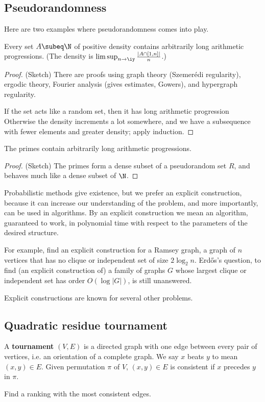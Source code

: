 
\subsection{Pseudorandomness}
Here are two examples where pseudorandomness comes into play.
\begin{thm}
Every set $A\subeq \N$ of positive density contains arbitrarily long arithmetic progressions. (The density is $\limsup_{n\to \iy} \frac{|A\cap [1,n]|}{n}$.)
\end{thm}
\begin{proof} (Sketch)
There are proofs using graph theory (Szemer\'edi regularity), ergodic theory, Fourier analysis (gives estimates, Gowers), and hypergraph regularity.

If the set acts like a random set, then it has long arithmetic progression
Otherwise the density increments a lot somewhere, and we have a subsequence with fewer elements and greater density; apply induction.
\end{proof}
\begin{thm}
The primes contain arbitrarily long arithmetic progressions.
\end{thm}
\begin{proof}(Sketch)
The primes form a dense subset of a pseudorandom set $R$, and behaves much like a dense subset of $\N$.
\end{proof}

Probabilistic methods give existence, but we prefer an explicit construction, because it can increase our understanding of the problem, and more importantly, can be used in algorithms. By an explicit construction we mean an algorithm, guaranteed to work, in polynomial time with respect to the parameters of the desired structure.

For example, find an explicit construction for a Ramsey graph, a graph of $n$ vertices that has no clique or independent set of size $2\log_2 n$. Erd\H{o}s's  question, to find (an explicit construction of) a family of graphs $G$ whose largest clique or independent set has order $O(\log|G|)$, is still unanswered.

Explicit constructions are known for several other problems.
\subsection{Quadratic residue tournament}
\begin{df}
A \textbf{tournament} $(V,E)$ is a directed graph with one edge between every pair of vertices, i.e. an orientation of a complete graph. We say $x$ beats $y$ to mean $(x,y)\in E$. Given permutation $\pi$ of $V$, $(x,y)\in E$ is consistent if $x$ precedes $y$ in $\pi$. 
\end{df}
Find a ranking with the most consistent edges.

